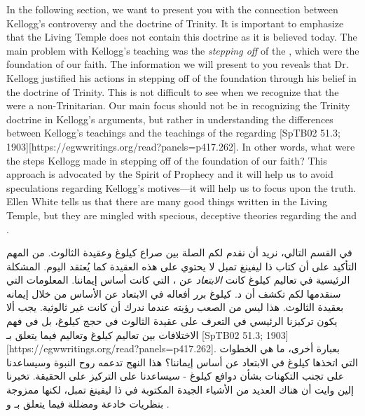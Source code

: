 In the following section, we want to present you with the connection between Kellogg’s controversy and the doctrine of Trinity. It is important to emphasize that the Living Temple does not contain this doctrine as it is believed today. The main problem with Kellogg’s teaching was the \textit{stepping off} of the , which were the foundation of our faith. The information we will present to you reveals that Dr. Kellogg justified his actions in stepping off of the foundation through his belief in the doctrine of Trinity. This is not difficult to see when we recognize that the  were a non-Trinitarian. Our main focus should not be in recognizing the Trinity doctrine in Kellogg's arguments, but rather in understanding the differences between Kellogg’s teachings and the teachings of the  regarding [SpTB02 51.3; 1903][https://egwwritings.org/read?panels=p417.262]. In other words, what were the steps Kellogg made in stepping off of the foundation of our faith? This approach is advocated by the Spirit of Prophecy and it will help us to avoid speculations regarding Kellogg’s motives—it will help us to focus upon the truth. Ellen White tells us that there are many good things written in the Living Temple, but they are mingled with specious, deceptive theories regarding the  and .


في القسم التالي، نريد أن نقدم لكم الصلة بين صراع كيلوغ وعقيدة الثالوث. من المهم التأكيد على أن كتاب ذا ليفينغ تمبل لا يحتوي على هذه العقيدة كما يُعتقد اليوم. المشكلة الرئيسية في تعاليم كيلوغ كانت \textit{الابتعاد} عن ، التي كانت أساس إيماننا. المعلومات التي سنقدمها لكم تكشف أن د. كيلوغ برر أفعاله في الابتعاد عن الأساس من خلال إيمانه بعقيدة الثالوث. هذا ليس من الصعب رؤيته عندما ندرك أن  كانت غير ثالوثية. يجب ألا يكون تركيزنا الرئيسي في التعرف على عقيدة الثالوث في حجج كيلوغ، بل في فهم الاختلافات بين تعاليم كيلوغ وتعاليم  فيما يتعلق بـ [SpTB02 51.3; 1903][https://egwwritings.org/read?panels=p417.262]. بعبارة أخرى، ما هي الخطوات التي اتخذها كيلوغ في الابتعاد عن أساس إيماننا؟ هذا النهج تدعمه روح النبوة وسيساعدنا على تجنب التكهنات بشأن دوافع كيلوغ - سيساعدنا على التركيز على الحقيقة. تخبرنا إلين وايت أن هناك العديد من الأشياء الجيدة المكتوبة في ذا ليفينغ تمبل، لكنها ممزوجة بنظريات خادعة ومضللة فيما يتعلق بـ  و .


